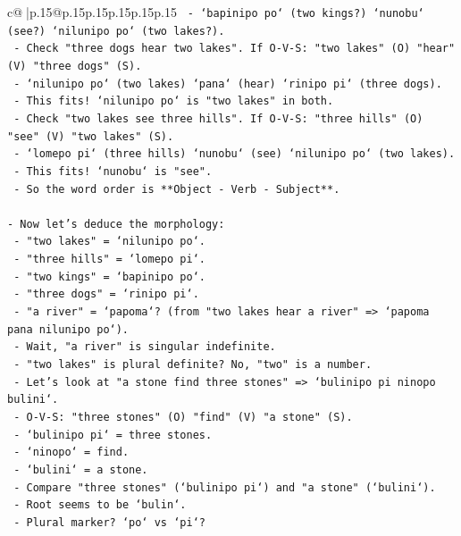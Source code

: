 \documentclass{article}
\begin{document}
{\begin{supertabular}{c@{$\;$}|p{.15\linewidth}@{}p{.15\linewidth}p{.15\linewidth}p{.15\linewidth}p{.15\linewidth}p{.15\linewidth}}
{{{\texttt{        {-} `bapinipo po` (two kings?) `nunobu` (see?) `nilunipo po` (two lakes?).} \\
\texttt{      {-} Check "three dogs hear two lakes". If O{-}V{-}S: "two lakes" (O) "hear" (V) "three dogs" (S).} \\
\texttt{        {-} `nilunipo po` (two lakes) `pana` (hear) `rinipo pi` (three dogs).} \\
\texttt{        {-} This fits! `nilunipo po` is "two lakes" in both.} \\
\texttt{      {-} Check "two lakes see three hills". If O{-}V{-}S: "three hills" (O) "see" (V) "two lakes" (S).} \\
\texttt{        {-} `lomepo pi` (three hills) `nunobu` (see) `nilunipo po` (two lakes).} \\
\texttt{        {-} This fits! `nunobu` is "see".} \\
\texttt{      {-} So the word order is **Object {-} Verb {-} Subject**.} \\
\\ 
\texttt{{-} Now let's deduce the morphology:} \\
\texttt{  {-} "two lakes" = `nilunipo po`.} \\
\texttt{  {-} "three hills" = `lomepo pi`.} \\
\texttt{  {-} "two kings" = `bapinipo po`.} \\
\texttt{  {-} "three dogs" = `rinipo pi`.} \\
\texttt{  {-} "a river" = `papoma`? (from "two lakes hear a river" => `papoma pana nilunipo po`).} \\
\texttt{    {-} Wait, "a river" is singular indefinite.} \\
\texttt{    {-} "two lakes" is plural definite? No, "two" is a number.} \\
\texttt{    {-} Let's look at "a stone find three stones" => `bulinipo pi ninopo bulini`.} \\
\texttt{      {-} O{-}V{-}S: "three stones" (O) "find" (V) "a stone" (S).} \\
\texttt{      {-} `bulinipo pi` = three stones.} \\
\texttt{      {-} `ninopo` = find.} \\
\texttt{      {-} `bulini` = a stone.} \\
\texttt{    {-} Compare "three stones" (`bulinipo pi`) and "a stone" (`bulini`).} \\
\texttt{      {-} Root seems to be `bulin`.} \\
\texttt{      {-} Plural marker? `po` vs `pi`?} \\
}}}
\end{supertabular}}
\end{document}
